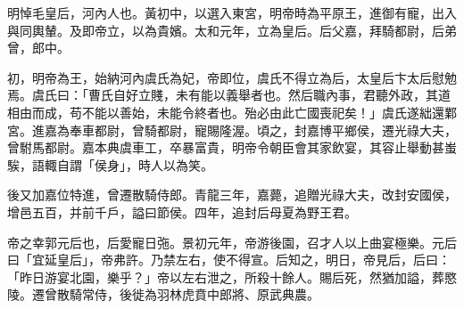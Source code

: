 \begin{pinyinscope}
 
 
 明悼毛皇后，河內人也。黃初中，以選入東宮，明帝時為平原王，進御有寵，出入與同輿輦。及即帝立，以為貴嬪。太和元年，立為皇后。后父嘉，拜騎都尉，后弟曾，郎中。
 
 
 
 
 初，明帝為王，始納河內虞氏為妃，帝即位，虞氏不得立為后，太皇后卞太后慰勉焉。虞氏曰：「曹氏自好立賤，未有能以義舉者也。然后職內事，君聽外政，其道相由而成，苟不能以善始，未能令終者也。殆必由此亡國喪祀矣！」虞氏遂絀還鄴宮。進嘉為奉車都尉，曾騎都尉，寵賜隆渥。頃之，封嘉博平鄉侯，遷光祿大夫，曾駙馬都尉。嘉本典虞車工，卒暴富貴，明帝令朝臣會其家飲宴，其容止舉動甚蚩騃，語輙自謂「侯身」，時人以為笑。
 
 
 後又加嘉位特進，曾遷散騎侍郎。青龍三年，嘉薨，追贈光祿大夫，改封安國侯，增邑五百，并前千戶，謚曰節侯。四年，追封后母夏為野王君。
 
 
 
 
 帝之幸郭元后也，后愛寵日㢮。景初元年，帝游後園，召才人以上曲宴極樂。元后曰「宜延皇后」，帝弗許。乃禁左右，使不得宣。后知之，明日，帝見后，后曰：「昨日游宴北園，樂乎？」帝以左右泄之，所殺十餘人。賜后死，然猶加謚，葬愍陵。遷曾散騎常侍，後徙為羽林虎賁中郎將、原武典農。
 
 
\end{pinyinscope}